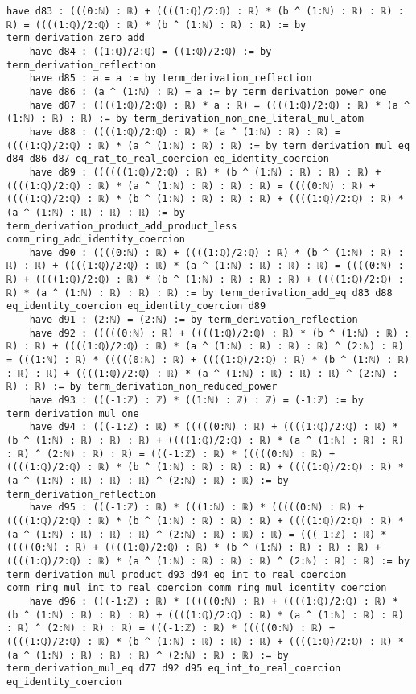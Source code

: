 \documentclass{article}
\begin{document}
\begin{tcolorbox}[colback=white!10, width=\linewidth]
\begin{lstlisting}[language=Lean4]
    have d83 : (((0:ℕ) : ℝ) + ((((1:ℚ)/2:ℚ) : ℝ) * (b ^ (1:ℕ) : ℝ) : ℝ) : ℝ) = ((((1:ℚ)/2:ℚ) : ℝ) * (b ^ (1:ℕ) : ℝ) : ℝ) := by term_derivation_zero_add
    have d84 : ((1:ℚ)/2:ℚ) = ((1:ℚ)/2:ℚ) := by term_derivation_reflection
    have d85 : a = a := by term_derivation_reflection
    have d86 : (a ^ (1:ℕ) : ℝ) = a := by term_derivation_power_one
    have d87 : ((((1:ℚ)/2:ℚ) : ℝ) * a : ℝ) = ((((1:ℚ)/2:ℚ) : ℝ) * (a ^ (1:ℕ) : ℝ) : ℝ) := by term_derivation_non_one_literal_mul_atom
    have d88 : ((((1:ℚ)/2:ℚ) : ℝ) * (a ^ (1:ℕ) : ℝ) : ℝ) = ((((1:ℚ)/2:ℚ) : ℝ) * (a ^ (1:ℕ) : ℝ) : ℝ) := by term_derivation_mul_eq d84 d86 d87 eq_rat_to_real_coercion eq_identity_coercion
    have d89 : ((((((1:ℚ)/2:ℚ) : ℝ) * (b ^ (1:ℕ) : ℝ) : ℝ) : ℝ) + ((((1:ℚ)/2:ℚ) : ℝ) * (a ^ (1:ℕ) : ℝ) : ℝ) : ℝ) = ((((0:ℕ) : ℝ) + ((((1:ℚ)/2:ℚ) : ℝ) * (b ^ (1:ℕ) : ℝ) : ℝ) : ℝ) + ((((1:ℚ)/2:ℚ) : ℝ) * (a ^ (1:ℕ) : ℝ) : ℝ) : ℝ) := by term_derivation_product_add_product_less comm_ring_add_identity_coercion
    have d90 : ((((0:ℕ) : ℝ) + ((((1:ℚ)/2:ℚ) : ℝ) * (b ^ (1:ℕ) : ℝ) : ℝ) : ℝ) + ((((1:ℚ)/2:ℚ) : ℝ) * (a ^ (1:ℕ) : ℝ) : ℝ) : ℝ) = ((((0:ℕ) : ℝ) + ((((1:ℚ)/2:ℚ) : ℝ) * (b ^ (1:ℕ) : ℝ) : ℝ) : ℝ) + ((((1:ℚ)/2:ℚ) : ℝ) * (a ^ (1:ℕ) : ℝ) : ℝ) : ℝ) := by term_derivation_add_eq d83 d88 eq_identity_coercion eq_identity_coercion d89
    have d91 : (2:ℕ) = (2:ℕ) := by term_derivation_reflection
    have d92 : (((((0:ℕ) : ℝ) + ((((1:ℚ)/2:ℚ) : ℝ) * (b ^ (1:ℕ) : ℝ) : ℝ) : ℝ) + ((((1:ℚ)/2:ℚ) : ℝ) * (a ^ (1:ℕ) : ℝ) : ℝ) : ℝ) ^ (2:ℕ) : ℝ) = (((1:ℕ) : ℝ) * (((((0:ℕ) : ℝ) + ((((1:ℚ)/2:ℚ) : ℝ) * (b ^ (1:ℕ) : ℝ) : ℝ) : ℝ) + ((((1:ℚ)/2:ℚ) : ℝ) * (a ^ (1:ℕ) : ℝ) : ℝ) : ℝ) ^ (2:ℕ) : ℝ) : ℝ) := by term_derivation_non_reduced_power
    have d93 : (((-1:ℤ) : ℤ) * ((1:ℕ) : ℤ) : ℤ) = (-1:ℤ) := by term_derivation_mul_one
    have d94 : (((-1:ℤ) : ℝ) * (((((0:ℕ) : ℝ) + ((((1:ℚ)/2:ℚ) : ℝ) * (b ^ (1:ℕ) : ℝ) : ℝ) : ℝ) + ((((1:ℚ)/2:ℚ) : ℝ) * (a ^ (1:ℕ) : ℝ) : ℝ) : ℝ) ^ (2:ℕ) : ℝ) : ℝ) = (((-1:ℤ) : ℝ) * (((((0:ℕ) : ℝ) + ((((1:ℚ)/2:ℚ) : ℝ) * (b ^ (1:ℕ) : ℝ) : ℝ) : ℝ) + ((((1:ℚ)/2:ℚ) : ℝ) * (a ^ (1:ℕ) : ℝ) : ℝ) : ℝ) ^ (2:ℕ) : ℝ) : ℝ) := by term_derivation_reflection
    have d95 : (((-1:ℤ) : ℝ) * (((1:ℕ) : ℝ) * (((((0:ℕ) : ℝ) + ((((1:ℚ)/2:ℚ) : ℝ) * (b ^ (1:ℕ) : ℝ) : ℝ) : ℝ) + ((((1:ℚ)/2:ℚ) : ℝ) * (a ^ (1:ℕ) : ℝ) : ℝ) : ℝ) ^ (2:ℕ) : ℝ) : ℝ) : ℝ) = (((-1:ℤ) : ℝ) * (((((0:ℕ) : ℝ) + ((((1:ℚ)/2:ℚ) : ℝ) * (b ^ (1:ℕ) : ℝ) : ℝ) : ℝ) + ((((1:ℚ)/2:ℚ) : ℝ) * (a ^ (1:ℕ) : ℝ) : ℝ) : ℝ) ^ (2:ℕ) : ℝ) : ℝ) := by term_derivation_mul_product d93 d94 eq_int_to_real_coercion comm_ring_mul_int_to_real_coercion comm_ring_mul_identity_coercion
    have d96 : (((-1:ℤ) : ℝ) * (((((0:ℕ) : ℝ) + ((((1:ℚ)/2:ℚ) : ℝ) * (b ^ (1:ℕ) : ℝ) : ℝ) : ℝ) + ((((1:ℚ)/2:ℚ) : ℝ) * (a ^ (1:ℕ) : ℝ) : ℝ) : ℝ) ^ (2:ℕ) : ℝ) : ℝ) = (((-1:ℤ) : ℝ) * (((((0:ℕ) : ℝ) + ((((1:ℚ)/2:ℚ) : ℝ) * (b ^ (1:ℕ) : ℝ) : ℝ) : ℝ) + ((((1:ℚ)/2:ℚ) : ℝ) * (a ^ (1:ℕ) : ℝ) : ℝ) : ℝ) ^ (2:ℕ) : ℝ) : ℝ) := by term_derivation_mul_eq d77 d92 d95 eq_int_to_real_coercion eq_identity_coercion

\end{lstlisting}
\end{tcolorbox}
\end{document}
